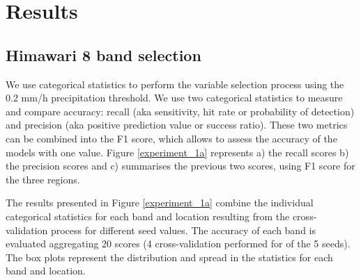 \documentclass[3p,times]{elsarticle}
\begin{document}
\section{Results}

 



\subsection{Himawari 8 band selection}

We use categorical statistics to perform the variable selection process using the 0.2 mm/h precipitation threshold. We use two categorical statistics to measure and compare accuracy: recall (aka sensitivity, hit rate or probability of detection) and precision (aka positive prediction value or success ratio). These two metrics can be combined into the F1 score, which allows to assess the accuracy of the models with one value. Figure \ref{experiment_1a} represents a) the recall scores b) the precision scores and c) summarises the previous two scores, using F1 score for the three regions. 

The results presented in Figure \ref{experiment_1a} combine the individual categorical statistics for each band and location resulting from the cross-validation process for different seed values. The accuracy of each band is evaluated aggregating 20 scores (4 cross-validation performed for of the 5 seeds). The box plots represent the distribution and spread in the statistics for each band and location. %
\end{document}
